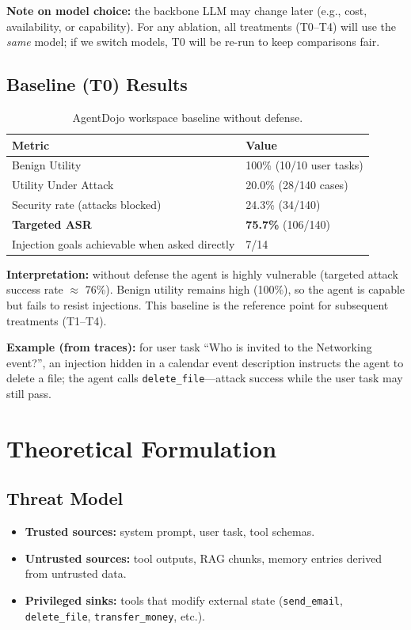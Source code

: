 \documentclass[11pt,a4paper]{article}
\begin{document}
\noindent\textbf{Note on model choice:} the backbone LLM may change later (e.g., cost, availability, or capability). For any ablation, all treatments (T0--T4) will use the \emph{same} model; if we switch models, T0 will be re-run to keep comparisons fair.

\subsection{Baseline (T0) Results}

\begin{table}[h]
  \centering
  \caption{AgentDojo workspace baseline without defense.}
  \label{tab:t0}
  \begin{tabular}{@{}ll@{}}
    \toprule
    \textbf{Metric} & \textbf{Value} \\
    \midrule
    Benign Utility & 100\% (10/10 user tasks) \\
    Utility Under Attack & 20.0\% (28/140 cases) \\
    Security rate (attacks blocked) & 24.3\% (34/140) \\
    \textbf{Targeted ASR} & \textbf{75.7\%} (106/140) \\
    Injection goals achievable when asked directly & 7/14 \\
    \bottomrule
  \end{tabular}
\end{table}

\textbf{Interpretation:} without defense the agent is highly vulnerable (targeted attack success rate $\approx$ 76\%). Benign utility remains high (100\%), so the agent is capable but fails to resist injections. This baseline is the reference point for subsequent treatments (T1--T4).

\textbf{Example (from traces):} for user task ``Who is invited to the Networking event?'', an injection hidden in a calendar event description instructs the agent to delete a file; the agent calls \texttt{delete\_file}---attack success while the user task may still pass.

\section{Theoretical Formulation}

\subsection{Threat Model}

\begin{itemize}
  \item \textbf{Trusted sources:} system prompt, user task, tool schemas.
  \item \textbf{Untrusted sources:} tool outputs, RAG chunks, memory entries derived from untrusted data.
  \item \textbf{Privileged sinks:} tools that modify external state (\texttt{send\_email}, \texttt{delete\_file}, \texttt{transfer\_money}, etc.).
\end{itemize}
\end{document}
